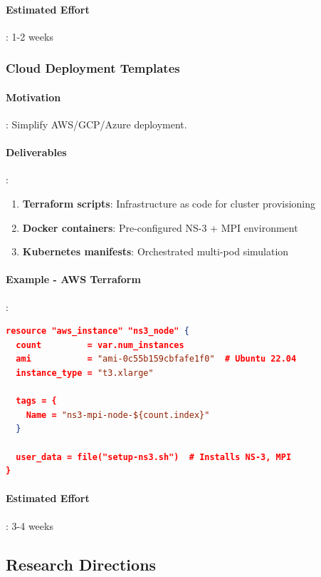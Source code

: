 \paragraph{Estimated Effort}: 1-2 weeks

\subsubsection{Cloud Deployment Templates}

\paragraph{Motivation}:
Simplify AWS/GCP/Azure deployment.

\paragraph{Deliverables}:
\begin{enumerate}
    \item \textbf{Terraform scripts}: Infrastructure as code for cluster provisioning
    \item \textbf{Docker containers}: Pre-configured NS-3 + MPI environment
    \item \textbf{Kubernetes manifests}: Orchestrated multi-pod simulation
\end{enumerate}

\paragraph{Example - AWS Terraform}:
\begin{lstlisting}[language=json, caption={terraform/main.tf}]
resource "aws_instance" "ns3_node" {
  count         = var.num_instances
  ami           = "ami-0c55b159cbfafe1f0"  # Ubuntu 22.04
  instance_type = "t3.xlarge"
  
  tags = {
    Name = "ns3-mpi-node-${count.index}"
  }
  
  user_data = file("setup-ns3.sh")  # Installs NS-3, MPI
}
\end{lstlisting}

\paragraph{Estimated Effort}: 3-4 weeks

\subsection{Research Directions}

